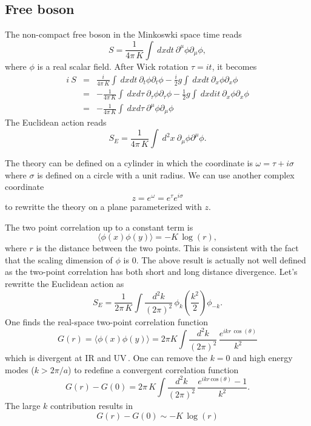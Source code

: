 \documentclass[submission, PhysLectNotes]{SciPost}
\begin{document}
\subsection{Free boson}
The non-compact free boson in the Minkoswki space time reads
\begin{equation}
    S = \frac{1}{4\pi\,K}\int \ dxdt \ \partial^\mu \phi \partial_\mu \phi,
\end{equation}
where $\phi$ is a real scalar field. After Wick rotation $\tau = it$, it becomes
\begin{eqnarray}
    i\ S &=& \frac{i}{4\pi\,K}\int \ dxdt \ \partial_t \phi \partial_t \phi - \frac{i}{2}g\int \ dxdt \ \partial_x \phi \partial_x \phi \nonumber \\
    &=& -\frac{1}{4\pi\,K}\int \ dxd\tau \ \partial_\tau \phi \partial_\tau \phi - \frac{1}{2}g\int \ dxdit \ \partial_x \phi \partial_x \phi \nonumber \\
    &=& -\frac{1}{4\pi\,K}\int \ dxd\tau \ \partial^\mu \phi \partial_\mu \phi
\end{eqnarray}
The Euclidean action reads
\begin{equation}
    S_E = \frac{1}{4\pi\,K}\int \ d^2x \ \partial_\mu \phi \partial^\mu \phi.
\end{equation}

The theory can be defined on a cylinder in which the coordinate is $\omega = \tau + i\sigma$ where $\sigma$ is defined on a circle with a unit radius. We can use another complex coordinate
\begin{equation}
  z = e^\omega = e^\tau e^{i\sigma}
\end{equation}
to rewritte the theory on a plane parameterized with $z$.

The two point correlation up to a constant term is
\begin{equation}
    \langle \phi(x) \phi(y) \rangle = -K\,\mathrm{\log} (r),
\end{equation}
where $r$ is the distance between the two points. This is consistent with the fact that the scaling dimension of $\phi$ is 0. The above result is actually not well defined as the two-point correlation has both short and long distance divergence. Let's rewritte the Euclidean action as 
\begin{equation}
	S_E = \frac{1}{2\pi\,K} \int\frac{d^2k}{(2\pi)^2} \, \phi_k \left(\frac{k^2}{2}\right)\phi_{-k}.
\end{equation} 
One finds the real-space two-point correlation function
\begin{equation}
	G(r) = \langle \phi(x) \phi(y) \rangle = 2\pi K \int \frac{d^2k}{(2\pi)^2}\, \frac{e^{ikr\,\cos(\theta)}}{k^2}
\end{equation}
which is divergent at IR and UV\,. One can remove the $k=0$ and high energy modes ($k>2\pi/a$) to redefine a convergent correlation function 
\begin{equation}
	G(r) - G(0) = 2\pi\,K \int \frac{d^2k}{(2\pi)^2}\, \frac{e^{ikr\,\mathrm{cos}(\theta)}-1}{k^2}.
\end{equation}
The large $k$ contribution results in
\begin{equation}
	G(r) - G(0) \sim -K\,\log(r)
\end{equation}
\end{document}

